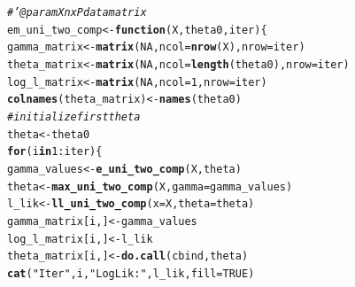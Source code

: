 \documentclass[10pt, a4paper, english]{article}\usepackage[]{graphicx}\usepackage[dvipsnames]{xcolor}
\makeatletter
\newcommand{\hlnum}[1]{\textcolor[rgb]{0.686,0.059,0.569}{#1}}%
\newcommand{\hlstr}[1]{\textcolor[rgb]{0.192,0.494,0.8}{#1}}%
\newcommand{\hlcom}[1]{\textcolor[rgb]{0.678,0.584,0.686}{\textit{#1}}}%
\newcommand{\hlopt}[1]{\textcolor[rgb]{0,0,0}{#1}}%
\newcommand{\hlstd}[1]{\textcolor[rgb]{0.345,0.345,0.345}{#1}}%
\newcommand{\hlkwa}[1]{\textcolor[rgb]{0.161,0.373,0.58}{\textbf{#1}}}%
\newcommand{\hlkwb}[1]{\textcolor[rgb]{0.69,0.353,0.396}{#1}}%
\newcommand{\hlkwc}[1]{\textcolor[rgb]{0.333,0.667,0.333}{#1}}%
\newcommand{\hlkwd}[1]{\textcolor[rgb]{0.737,0.353,0.396}{\textbf{#1}}}%
\newenvironment{kframe}{%
 \def\at@end@of@kframe{}%
 \ifinner\ifhmode%
  \def\at@end@of@kframe{\end{minipage}}%
  \begin{minipage}{\columnwidth}%
 \fi\fi%
 \def\FrameCommand##1{\hskip\@totalleftmargin \hskip-\fboxsep
 \colorbox{shadecolor}{##1}\hskip-\fboxsep
     \hskip-\linewidth \hskip-\@totalleftmargin \hskip\columnwidth}%
 \MakeFramed {\advance\hsize-\width
   \@totalleftmargin\z@ \linewidth\hsize
   \@setminipage}}%
 {\par\unskip\endMakeFramed%
 \at@end@of@kframe}
\newenvironment{knitrout}{}{} %
\makeatother
\begin{document}
\begin{knitrout}
\color{fgcolor}\begin{kframe}
\begin{alltt}
\hlcom{#' @param X  n x P data matrix}
\hlstd{em_uni_two_comp} \hlkwb{<-} \hlkwa{function}\hlstd{(}\hlkwc{X}\hlstd{,} \hlkwc{theta0}\hlstd{,} \hlkwc{iter}\hlstd{)\{}
  \hlstd{gamma_matrix} \hlkwb{<-} \hlkwd{matrix}\hlstd{(}\hlnum{NA}\hlstd{,} \hlkwc{ncol}\hlstd{=}\hlkwd{nrow}\hlstd{(X),} \hlkwc{nrow}\hlstd{=iter)}
  \hlstd{theta_matrix} \hlkwb{<-} \hlkwd{matrix}\hlstd{(}\hlnum{NA}\hlstd{,} \hlkwc{ncol}\hlstd{=}\hlkwd{length}\hlstd{(theta0),} \hlkwc{nrow}\hlstd{=iter)}
  \hlstd{log_l_matrix} \hlkwb{<-} \hlkwd{matrix}\hlstd{(}\hlnum{NA}\hlstd{,} \hlkwc{ncol}\hlstd{=}\hlnum{1}\hlstd{,} \hlkwc{nrow}\hlstd{=iter)}
  \hlkwd{colnames}\hlstd{(theta_matrix)} \hlkwb{<-} \hlkwd{names}\hlstd{(theta0)}
  \hlcom{#initialize first theta}
   \hlstd{theta} \hlkwb{<-} \hlstd{theta0}
  \hlkwa{for} \hlstd{(i} \hlkwa{in} \hlnum{1}\hlopt{:}\hlstd{iter)\{}
    \hlstd{gamma_values} \hlkwb{<-} \hlkwd{e_uni_two_comp}\hlstd{(X, theta)}
    \hlstd{theta} \hlkwb{<-} \hlkwd{max_uni_two_comp}\hlstd{(X,} \hlkwc{gamma}\hlstd{=gamma_values)}
    \hlstd{l_lik} \hlkwb{<-} \hlkwd{ll_uni_two_comp}\hlstd{(}\hlkwc{x}\hlstd{=X,} \hlkwc{theta}\hlstd{=theta)}
    \hlstd{gamma_matrix[i,]} \hlkwb{<-} \hlstd{gamma_values}
    \hlstd{log_l_matrix[i,]} \hlkwb{<-} \hlstd{l_lik}
    \hlstd{theta_matrix[i,]} \hlkwb{<-} \hlkwd{do.call}\hlstd{(cbind, theta)}
    \hlkwd{cat}\hlstd{(}\hlstr{"Iter"}\hlstd{, i,} \hlstr{"Log Lik: "}\hlstd{,l_lik,} \hlkwc{fill} \hlstd{=} \hlnum{TRUE}\hlstd{)}


\end{alltt}
\end{kframe}
\end{knitrout}
\end{document}
